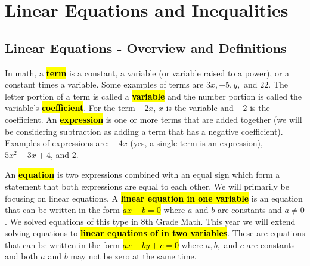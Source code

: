 \chapter{Linear Equations and Inequalities}\label{chapter:linear}
\section{Linear Equations - Overview and Definitions}
In math, a \hl{\textbf{term}} is a constant, a variable (or variable raised to a power), or a constant times a variable. Some examples of terms are $3x, -5, y, $ and $22$. The letter portion of a term is called a \hl{\textbf{variable}} and the number portion is called the variable's \hl{\textbf{coefficient}}. For the term $-2x$, $x$ is the variable and $-2$ is the coefficient. An \hl{\textbf{expression}} is one or more terms that are added together (we will be considering subtraction as adding a term that has a negative coefficient). Examples of expressions are: $-4x$ (yes, a single term is an expression), $5x^2-3x+4$, and $2$. 
 
An \hl{\textbf{equation}} is two expressions combined with an equal sign which form a statement that both expressions are equal to each other. We will primarily be focusing on linear equations. A \hl{\textbf{linear equation in one variable}} is an equation that can be written in the form \hl{$ax+b =0$} where $a$ and $b$ are constants and $a\neq 0$. We solved equations of this type in 8th Grade Math. This year we will extend solving equations to \hl{\textbf{linear equations of in two variables}}. These are equations that can be written in the form \hl{$ax+by+c=0$} where $a, b,$ and $c$ are constants and both $a$ and $b$ may not be zero at the same time.
